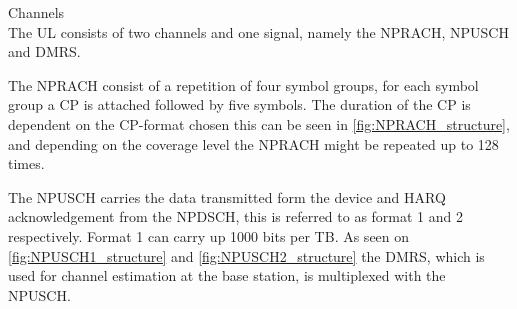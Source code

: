 Channels\\
The \gls{UL} consists of two channels and one signal, namely the \gls{NPRACH}, \gls{NPUSCH} and \gls{DMRS}.

The \gls{NPRACH} consist of a repetition of four symbol groups, for each symbol group a \gls{CP} is attached followed by five symbols. The duration of the CP is dependent on the CP-format chosen this can be seen in \autoref{fig:NPRACH_structure}, and depending on the coverage level the \gls{NPRACH} might be repeated up to 128 times. \citep{NB-IoT_Book}

The \gls{NPUSCH} carries the data transmitted form the device and \gls{HARQ} acknowledgement from the \gls{NPDSCH}, this is referred to as format 1 and 2 respectively. Format 1 can carry up 1000 bits per \gls{TB}. As seen on \autoref{fig:NPUSCH1_structure} and \autoref{fig:NPUSCH2_structure} the DMRS, which is used for channel estimation at the base station, is multiplexed with the NPUSCH. 



